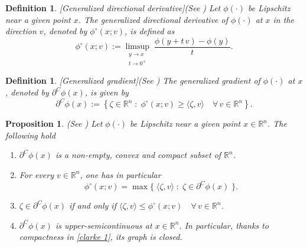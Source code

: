 \documentclass[12pt]{amsart}
\numberwithin{equation}{section}
\theoremstyle{plain}
\newtheorem{proposition}[theorem]{Proposition}
\newtheorem{definition}[theorem]{Definition}
\begin{document}
\begin{definition}\label{def: general direc deriv}[Generalized directional derivative](See \cite[Page 70]{clarke1998nonsmooth})
Let $\phi(\cdot)$ be Lipschitz near a given point $x$. The generalized directional derivative of $\phi(\cdot)$ at $x$ in the direction $v$, denoted by $\phi^{\circ}(x ; v)$, is defined as
\begin{equation*}
    \phi^{\circ}(x ; v):=\limsup _{\substack{y \rightarrow x \\ t \rightarrow 0^{+}}} \; \frac{\phi(y+t \,v) - \phi(y)}{t}.
\end{equation*} 
\end{definition}

\begin{definition}\label{def: general grad}[Generalized gradient](See \cite[Page 27]{clarke1990optimization})
The generalized gradient of $\phi(\cdot)$ at $x$, denoted by $\partial^{C} \phi(x)$, is given by
\begin{equation*}
    \partial^{C} \phi(x) := \left\{\zeta\in\mathbb{R}^n \;:\; \phi^{\circ}(x ; v) \geqslant\langle\zeta, v\rangle \quad \forall\, v \in \mathbb{R}^n\right\} .
\end{equation*}
\end{definition}

\begin{proposition}\label{prop: clarke}(See \cite[Proposition 1.5, page 73]{clarke1998nonsmooth})
Let $\phi(\cdot)$ be Lipschitz near a given point $x\in \mathbb{R}^{n}$. The following hold
\begin{enumerate}[label = (\alph*)]
    \item\label{clarke 1} $\partial^{C} \phi(x)$ is a non-empty, convex and compact subset of $\mathbb{R}^{n}$.
    \item\label{clarke 2} For every $v \in \mathbb{R}^{n}$, one has in particular 
    \begin{equation*}
        \phi^{\circ}(x ; v)=\max \{\;\langle\zeta, v\rangle \;:\; \zeta \in \partial^{C} \phi(x)\; \}.
    \end{equation*}
    \item\label{clarke 3} $\zeta \in \partial^{C}\phi(x)$ \; if and only if \;$ \langle \zeta,v \rangle \leq \phi^{\circ}(x;v) \quad \forall\,v\in \mathbb{R}^{n}$.
    \item\label{clarke 4} $\partial^{C}\phi(x)$ is upper-semicontinuous at $x\in \mathbb{R}^{n}$. In particular, thanks to compactness in \ref{clarke 1}, its graph is closed. 
\end{enumerate}
\end{proposition}
\end{document}
